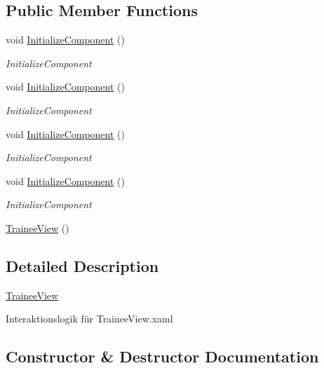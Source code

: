 \subsection*{Public Member Functions}
\begin{DoxyCompactItemize}
\item 
void \hyperlink{class_rowing_monitor_1_1_view_1_1_trainee_view_aafd3b2c6136bc2da309abd7b3706619a}{Initialize\+Component} ()
\begin{DoxyCompactList}\small\item\em Initialize\+Component \end{DoxyCompactList}\item 
void \hyperlink{class_rowing_monitor_1_1_view_1_1_trainee_view_aafd3b2c6136bc2da309abd7b3706619a}{Initialize\+Component} ()
\begin{DoxyCompactList}\small\item\em Initialize\+Component \end{DoxyCompactList}\item 
void \hyperlink{class_rowing_monitor_1_1_view_1_1_trainee_view_aafd3b2c6136bc2da309abd7b3706619a}{Initialize\+Component} ()
\begin{DoxyCompactList}\small\item\em Initialize\+Component \end{DoxyCompactList}\item 
void \hyperlink{class_rowing_monitor_1_1_view_1_1_trainee_view_aafd3b2c6136bc2da309abd7b3706619a}{Initialize\+Component} ()
\begin{DoxyCompactList}\small\item\em Initialize\+Component \end{DoxyCompactList}\item 
\hyperlink{class_rowing_monitor_1_1_view_1_1_trainee_view_a55adf0bf6d8b9506ff25ce04432badb6}{Trainee\+View} ()
\end{DoxyCompactItemize}


\subsection{Detailed Description}
\hyperlink{class_rowing_monitor_1_1_view_1_1_trainee_view}{Trainee\+View} 

Interaktionslogik für Trainee\+View.\+xaml 

\subsection{Constructor \& Destructor Documentation}
\mbox{\label{class_rowing_monitor_1_1_view_1_1_trainee_view_a55adf0bf6d8b9506ff25ce04432badb6}} 

